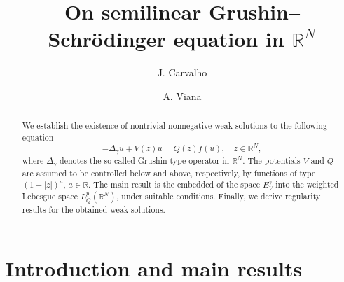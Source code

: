 \documentclass[12pt]{amsart}
\newcommand{\R}{\mathbb{R}}
\begin{document}
	

	
\title[On Grushin--Schrödinger equation in $\R^N$ ]{On semilinear Grushin--Schrödinger equation in $\R^N$}




\author[J. Carvalho]{J. Carvalho}
\address{Universidade Federal de Sergipe, Departamento de Matem\'atica, 49100-000 São Cristóvão-SE, Brazil}



\author[A. Viana]{A. Viana}
\address{Universidade Federal de Sergipe, Departamento de Matem\'atica, 49100-000 São Cristóvão-SE, Brazil}  
\address{Universit\"at Ulm, Institut f\"ur Angewandte Mathematik, 89069, Ulm-BW, Germany}









\begin{abstract} 
	We establish the existence of nontrivial nonnegative  weak solutions to the following equation  
	\begin{equation*}
		-\Delta_\gamma u + V(z)u = Q(z)f(u), \quad z\in \mathbb{R}^N, 
	\end{equation*}
	where $\Delta_\gamma $ denotes the so-called Grushin-type operator in $\mathbb{R}^N$. The potentials $V$ and $Q$ are assumed to be controlled below and above, respectively, by functions of type $(1+|z|)^a$,  $a\in\R$. The main result is the embedded of the space $E_V^\gamma$  into the weighted Lebesgue space $L_Q^p(\R^N)$, under suitable conditions. Finally, we derive regularity results for the obtained weak solutions. 
	
	
\end{abstract}



\maketitle

\section{Introduction and main results}
\end{document}
